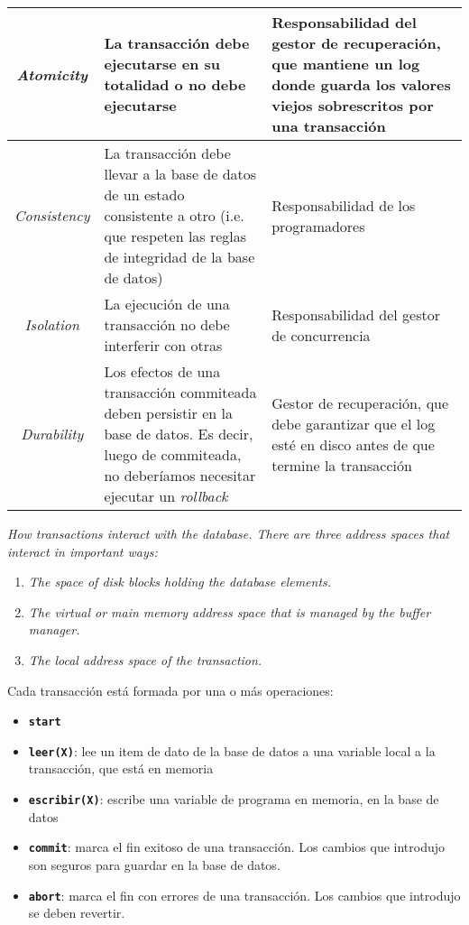 \documentclass[a4paper, twoside]{article}
\begin{document}
\begin{tabular}{|c|>{\centering}m{7cm}|>{\centering}m{5cm}|}
	\hline 
	\emph{Atomicity} & La transacción debe ejecutarse en su totalidad o no debe ejecutarse & Responsabilidad del gestor de recuperación, que mantiene un log donde guarda los valores viejos sobrescritos por una transacción \tabularnewline
	\hline 
	\emph{Consistency} & La transacción debe llevar a la base de datos de un estado consistente a otro (i.e. que respeten las reglas de integridad de la base de datos) & Responsabilidad de los programadores \tabularnewline
	\hline
	\emph{Isolation} & La ejecución de una transacción no debe interferir con otras & Responsabilidad del gestor de concurrencia \tabularnewline
	\hline 
	\emph{Durability} & Los efectos de una transacción commiteada deben persistir en la base de datos. Es decir, luego de commiteada, no deberíamos necesitar ejecutar un \emph{rollback} & Gestor de recuperación, que debe garantizar que el log esté en disco antes de que termine la transacción \tabularnewline
	\hline 
\end{tabular}

\emph{How transactions interact with the database. There are three address spaces that interact in important ways:}
\begin{enumerate}
	\item \emph{The space of disk blocks holding the database elements.}
	\item \emph{The virtual or main memory address space that is managed by the buffer manager.}
	\item \emph{The local address space of the transaction.}
\end{enumerate}

Cada transacción está formada por una o más operaciones:
\begin{itemize}
	\item \texttt{\textbf{start}}
	\item \texttt{\textbf{leer(X)}}: lee un item de dato de la base de datos a una variable local a la transacción, que está en memoria
	\item \texttt{\textbf{escribir(X)}}: escribe una variable de programa en memoria, en la base de datos
	\item \texttt{\textbf{commit}}: marca el fin exitoso de una transacción. Los cambios que introdujo son seguros para guardar en la base de datos.
	\item \texttt{\textbf{abort}}: marca el fin con errores de una transacción. Los cambios que introdujo se deben revertir.
\end{itemize}
\end{document}
